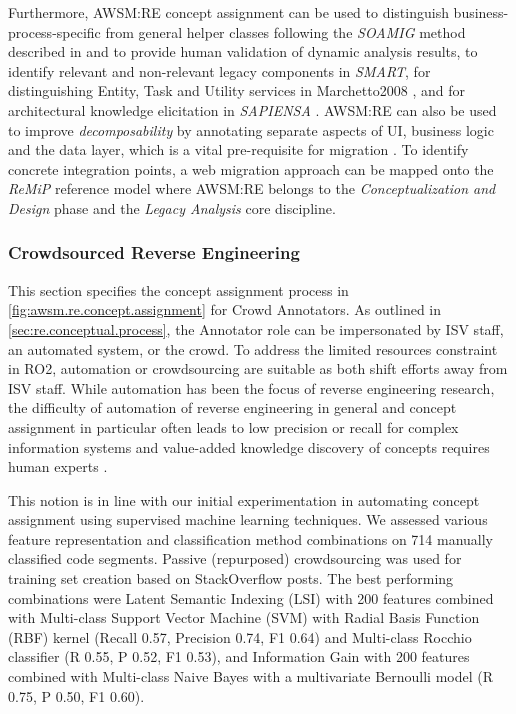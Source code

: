 Furthermore, AWSM:RE concept assignment can be used to distinguish business-process-specific from
general helper classes following the \emph{SOAMIG} method described in \autocite{Fuhr2013SOAMIG} and to provide human validation of dynamic analysis results, to identify relevant and non-relevant legacy components \autocite{Lewis2008SMART} in \emph{SMART}, for distinguishing Entity, Task and Utility services in Marchetto2008 \autocite{Marchetto2008}, and for architectural knowledge elicitation in \emph{SAPIENSA} \autocite{Razavian2010SAPIENSA}.
AWSM:RE can also be used to improve \emph{decomposability} by annotating separate aspects of UI, business logic and the data layer, which is a vital pre-requisite for migration \autocite{Lucia2008,Brodie1995Migrating,Canfora2000Decomposing}.
To identify concrete integration points, a web migration approach can be mapped onto the \emph{ReMiP} reference model \autocite{Sneed2010ReMiP,Gipp2007ReMiP} where AWSM:RE belongs to the \emph{Conceptualization and Design} phase and the \emph{Legacy Analysis} core discipline.

\hypertarget{sec:csre}{%
\subsubsection{Crowdsourced Reverse Engineering}\label{sec:csre}}

This section specifies the concept assignment process in \cref{fig:awsm.re.concept.assignment} for Crowd Annotators.
As outlined in \cref{sec:re.conceptual.process}, the Annotator role can be impersonated by ISV staff, an automated system, or the crowd.
To address the limited resources constraint in RO2, automation or crowdsourcing are suitable as both shift efforts away from ISV staff.
While automation has been the focus of reverse engineering research, the difficulty of automation of reverse engineering in general \autocite{Canfora2007ReverseEngineering} and concept assignment in particular \autocite{Biggerstaff1993ConceptAssignmentICSE} often leads to low precision or recall \autocite{Canfora2007ReverseEngineering} for complex information systems and value-added knowledge discovery of concepts requires human experts \autocite{Perez-Castillo2011KDM}.

This notion is in line with our initial experimentation in automating concept assignment using supervised machine learning techniques.
We assessed various feature representation and classification method combinations on 714 manually classified code segments.
Passive (repurposed) crowdsourcing was used for training set creation based on StackOverflow posts.
The best performing combinations were Latent Semantic Indexing (LSI) \autocite{Deerwester1990LSI} with 200 features combined with Multi-class Support Vector Machine (SVM) with Radial Basis Function (RBF) kernel \autocite{Scholkopf1997SVMRBF} (Recall 0.57, Precision 0.74, F1 0.64) and Multi-class Rocchio classifier \autocite{Joachims1997Rocchio} (R 0.55, P 0.52, F1 0.53), and Information Gain \autocite{Lee2006IG} with 200 features combined with Multi-class Naive Bayes with a multivariate Bernoulli model \autocite{McCallum1998NB} (R 0.75, P 0.50, F1 0.60).


